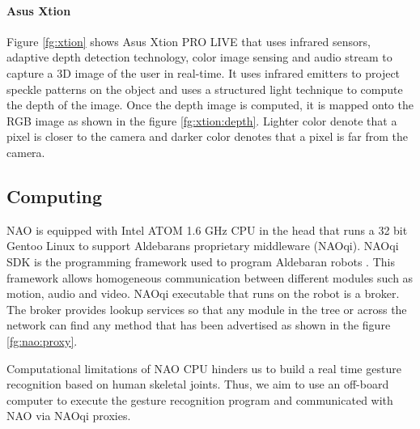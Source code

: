 

\paragraph*{Asus Xtion} Figure \ref{fg:xtion} shows Asus Xtion PRO LIVE that uses infrared sensors, adaptive depth detection technology, color image sensing and audio stream to capture a 3D image of the user in real-time. It uses infrared emitters to project speckle patterns on the object and uses a structured light technique to compute the depth of the image. Once the depth image is computed, it is mapped onto the RGB image as shown in the figure \ref{fg:xtion:depth}. Lighter color denote that a pixel is closer to the camera and darker color denotes that a pixel is far from the camera.



\subsection{Computing} NAO is equipped with Intel ATOM 1.6 GHz CPU in the head that runs a 32 bit Gentoo Linux to support Aldebarans proprietary middleware (NAOqi). NAOqi SDK is the programming framework used to program Aldebaran robots \cite{8}. This framework allows homogeneous communication between different modules such as motion, audio and video. NAOqi executable that runs on the robot is a broker. The broker provides lookup services so that any module in the tree or across the network can find any method that has been advertised as shown in the figure \ref{fg:nao:proxy}.



Computational limitations \cite{17} of NAO CPU hinders us to build a real time gesture recognition based on human skeletal joints. Thus, we aim to use an off-board computer to execute the gesture recognition program and communicated with NAO via NAOqi proxies. 
